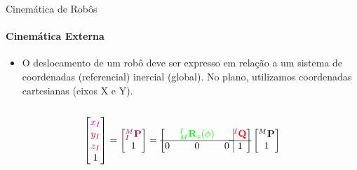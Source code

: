 \documentclass[aspectratio=169]{beamer}
\begin{document}
\begin{frame}{Cinemática de Robôs}
    \framesubtitle{Cinemática Externa}
    \begin{itemize}
        \item O deslocamento de um robô deve ser expresso em relação a um sistema de
              coordenadas (referencial) inercial (global). No plano, utilizamos coordenadas
              cartesianas (eixos X e Y).
    \end{itemize}

    \begin{columns}
        \begin{column}[c]{0.5\textwidth}
            
        \end{column}
        \begin{column}[c]{0.5\textwidth}
            
        \end{column}
    \end{columns}

    \begin{equation*}
        \begin{bmatrix}
            \color{purple}{x_I} \\ \color{purple}{y_I} \\ \color{purple}{z_I}\\1
        \end{bmatrix}
        =
        \begin{bmatrix}
            \color{purple}{{}^M_I\mathbf{P}} \\ 1
        \end{bmatrix}
        =
        \left[
            \begin{matrix}
                  & \color{green}{{}_M^I\mathbf{R}_z(\phi)} &   \\ \hline
                0 & 0                                       & 0 \\
            \end{matrix} \right.
            \left.
            \vline
            \begin{matrix}
                \color{red}{{}^I\mathbf{Q}} \\ \hline
                1
            \end{matrix} \right]
        \begin{bmatrix}
            {}^M\mathbf{P} \\
            1
        \end{bmatrix}
    \end{equation*}

\end{frame}
\end{document}
